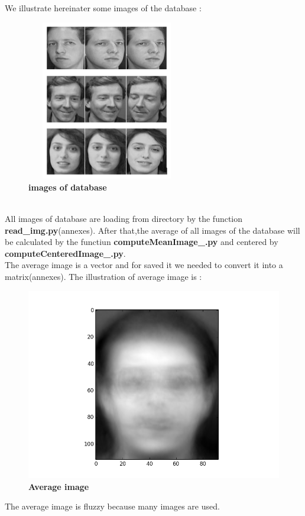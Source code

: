 We illustrate hereinater some images of the database :
\begin{figure}[bth]%
\begin{center}
\includegraphics[scale=0.75,height=70mm,width=70mm]{capture_img}%
\caption{\textbf{images of database }}%
\end {center}
\end{figure}
\\All images of database are loading from directory by the function \textbf{read\_img.py}(annexes).
After that,the average of all images of the database will be calculated by the functiun \textbf{computeMeanImage\_.py} and centered by \textbf{computeCenteredImage\_.py}.
\\The average image is a vector and for saved it we needed to  convert it into a matrix(annexes).
\clearpage
The illustration of average image is :

\begin{figure}[bth]%
\begin{center}
\includegraphics[scale=0.75]{figure_1}%
\caption{\textbf{Average image }}%
\end {center}
\end{figure}
The average image is fluzzy because many images are used.
\clearpage
